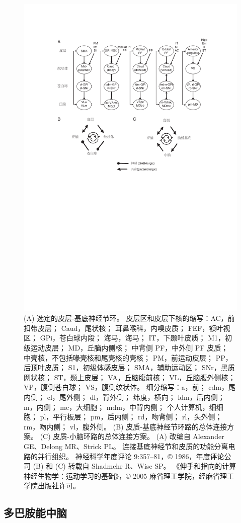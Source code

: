 \begin{figure} 
	\centering
	\includegraphics[width=0.7\linewidth]{chap8/fig_8_1}
	\caption{(A) 选定的皮层-基底神经节环。 
	皮层区和皮层下核的缩写：AC，前扣带皮层； Caud，尾状核； 耳鼻喉科，内嗅皮质； FEF，额叶视区； GPi，苍白球内段； 海马，海马； IT，下颞叶皮质； M1，初级运动皮层； MD，丘脑内侧核； 中背侧 PF，中外侧 PF 皮质； 中壳核，不包括喙壳核和尾壳核的壳核； PM，前运动皮层； PP，后顶叶皮质； S1，初级体感皮层； SMA，辅助运动区； SNr，黑质网状核； ST，颞上皮层； VA，丘脑腹前核； VL，丘脑腹外侧核； VP，腹侧苍白球； VS，腹侧纹状体。 细分缩写：a，前； cdm，尾内侧； cl，尾外侧； dl，背外侧； 纬度，横向； ldm，后内侧； m，内侧； mc，大细胞； mdm，中背内侧； 个人计算机，细细胞； pl，平行板层； pm，后内侧； rd，吻背侧； rl，头外侧； rm，吻内侧； vl，腹外侧。 (B) 皮质-基底神经节环路的总体连接方案。 (C) 皮质-小脑环路的总体连接方案。 (A) 改编自 Alexander GE、Delong MR、Strick PL。 连接基底神经节和皮质的功能分离电路的并行组织。 神经科学年度评论 9:357–81，© 1986，年度评论公司 (B) 和 (C) 转载自 Shadmehr R、Wise SP。 《伸手和指向的计算神经生物学：运动学习的基础》，© 2005 麻省理工学院，经麻省理工学院出版社许可。\label{fig:8_1}}
\end{figure}





\subsection{多巴胺能中脑}
\par

